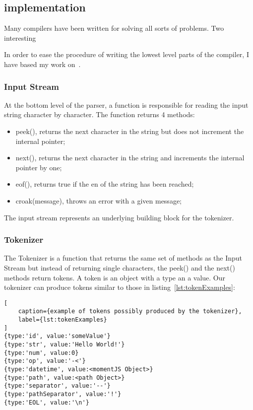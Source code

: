 \subsection{implementation}

Many compilers have been written for solving all sorts of problems. Two interesting 


In order to ease the procedure of writing the lowest level parts of the compiler, I have based my work on~\cite{bazon16}.

\subsubsection{Input Stream}

At the bottom level of the parser, a function is responsible for reading the input string character by character. The function returns 4 methods:

\begin{itemize}
    \item peek(), returns the next character in the string but does not increment the internal pointer;
    \item next(), returns the next character in the string and increments the internal pointer by one;
    \item eof(), returns true if the en of the string has been reached;
    \item croak(message), throws an error with a given message;
\end{itemize}

The input stream represents an underlying building block for the tokenizer.

\subsubsection{Tokenizer}

The Tokenizer is a function that returns the same set of methods as the Input Stream but instead of returning single characters, the peek() and the next() methods return tokens. A token is an object with a type an a value. Our tokenizer can produce tokens similar to those in listing~\ref{lst:tokenExamples}:

\begin{lstlisting}[
    caption={example of tokens possibly produced by the tokenizer},
    label={lst:tokenExamples}
]
{type:'id', value:'someValue'}
{type:'str', value:'Hello World!'}
{type:'num', value:0}
{type:'op', value:'-<'}
{type:'datetime', value:<momentJS Object>}
{type:'path', value:<path Object>}
{type:'separator', value:'--'}
{type:'pathSeparator', value:'!'}
{type:'EOL', value:'\n'}
\end{lstlisting}


